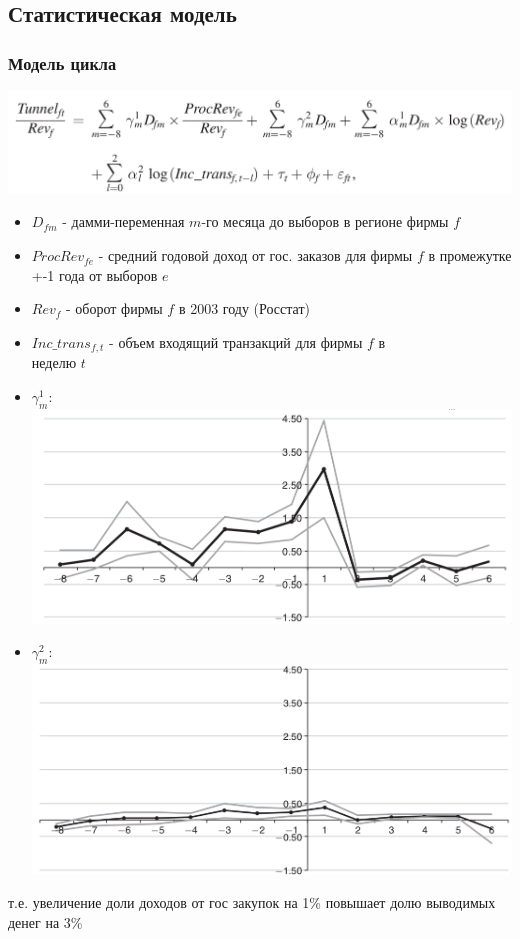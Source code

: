 \subsection{Статистическая модель}

\begin{frame}
\frametitle{Модель цикла}
\includegraphics[scale=0.18]{images/cycle2}
\begin{itemize}
	\item $D_{fm}$ - дамми-переменная $m$-го месяца до выборов в регионе фирмы $f$
	\item $ProcRev_{fe}$ - средний годовой доход от гос. заказов для фирмы $f$ в промежутке +-1 года от выборов $e$
	\item $Rev_{f}$ - оборот фирмы $f$ в 2003 году (Росстат)
	\item $Inc\_trans_{f,t}$ - объем входящий транзакций для фирмы $f$ в \\неделю $t$
\end{itemize}
\end{frame}

\begin{frame}
\begin{itemize}
	\item $\gamma^1_m$:\\
		\includegraphics[scale=0.18]{images/el_effect_gamma1}
	
	\item $\gamma^2_m$:\\
		\includegraphics[scale=0.18]{images/el_effect_gamma2}
\end{itemize}
т.е. увеличение доли доходов от гос закупок на 1\% повышает долю выводимых денег на 3\%
\end{frame}


